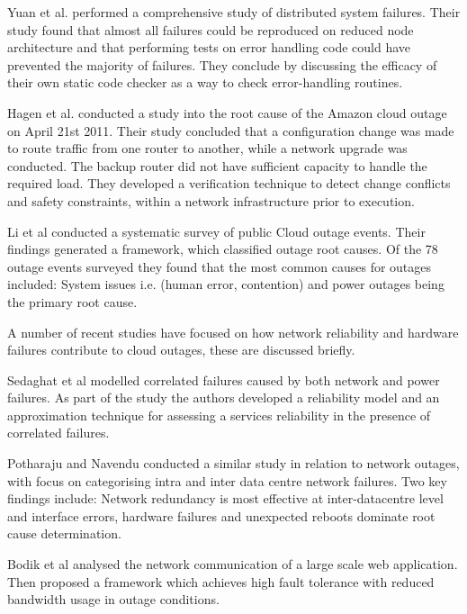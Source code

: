 \documentclass[5p]{elsarticle}
\begin{document}
Yuan et al. \cite{yuan2014simple} performed a comprehensive study of distributed system failures. Their study found that almost all failures could be reproduced on reduced node architecture and that performing tests on error handling code could have prevented the majority of failures. They conclude by discussing the efficacy of their own static code checker as a way to check error-handling routines. \par

Hagen et al. \cite{hagen2012efficient} conducted a study into the root cause of the Amazon cloud outage on April 21st 2011. Their study concluded that a configuration change was made to route traffic from one router to another, while a network upgrade was conducted. The backup router did not have sufficient capacity to handle the required load. They developed a verification technique to detect change conflicts and safety constraints, within a network infrastructure prior to execution. \par

Li et al \cite{li2013cloud} conducted a systematic survey of public Cloud outage events. Their findings generated a  framework, which classified outage root causes. Of the 78 outage events surveyed they found that the most common causes for outages included: System issues i.e. (human error, contention) and power outages being the primary root cause. \par

A number of recent studies have focused on how network reliability and hardware failures contribute to cloud outages, these are discussed briefly. \par

Sedaghat et al \cite{sedaghat2015hard} modelled correlated failures caused by both network and power failures. As part of the study the authors developed a reliability model and an approximation technique for assessing a services reliability in the presence of correlated failures. \par 

Potharaju and Navendu \cite{potharaju2013network} conducted a similar study in relation to network outages, with focus on categorising intra and inter data centre network failures. Two key findings include: Network redundancy is most effective at inter-datacentre level and interface errors, hardware failures and unexpected reboots dominate root cause determination. \par

Bodik et al \cite{bodik2012surviving} analysed the network communication of a large scale web application. Then proposed a framework which achieves high fault tolerance with reduced bandwidth usage in outage conditions. \par 
\end{document}
